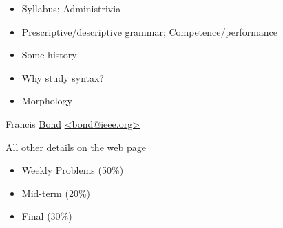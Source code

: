 \documentclass[a4paper,landscape,headrule,footrule]{foils}
\begin{document}
\maketitle

%


\begin{itemize}
\item Syllabus; Administrivia
\item Prescriptive/descriptive grammar;
Competence/performance
\item Some history
\item Why study syntax?
\item Morphology
\end{itemize}

\begin{description}
\item [Coordinator]  Francis \ul{Bond} 
\url{<bond@ieee.org>}
\item All other details on the web page

\end{description}



\begin{itemize}
\item Weekly Problems (50\%)
\item Mid-term (20\%)
\item Final (30\%)
\end{itemize}



\end{document}
